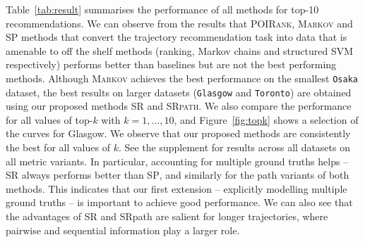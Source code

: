 

Table~\ref{tab:result} summarises the performance of all methods for top-10 recommendations.
We can observe from the results that \textsc{POIRank}, \textsc{Markov} and \textsc{SP}
methods that convert the trajectory recommendation task
into data that is amenable to off the shelf methods (ranking, Markov chains and structured SVM respectively)
performs better than baselines but are not the best performing methods.
Although \textsc{Markov} achieves the best performance on the smallest \texttt{Osaka} dataset,
the best results on larger datasets (\ie \texttt{Glasgow} and \texttt{Toronto}) are obtained using our proposed methods
\textsc{SR} and \textsc{SRpath}.
We also compare the performance for all values of top-$k$ with $k=1,\ldots,10$, and
Figure~\ref{fig:topk} shows a selection of the curves for Glasgow. We observe that
our proposed methods are consistently the best for all values of $k$.
See the supplement for results across all datasets on all metric variants.
In particular,
accounting for multiple ground truths helps --
\textsc{SR} always performs better than \textsc{SP},
and similarly for the {\sc path} variants of both methods.
This indicates that our first extension -- explicitly modelling multiple ground truths
 -- is important to achieve good performance.
We can also see that the advantages of {\sc SR} %
and {\sc SRpath} are salient for longer trajectories, where pairwise and sequential information play a larger role.

